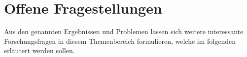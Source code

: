 \section{Offene Fragestellungen}
\label{openChallenges}
Aus den genannten Ergebnissen und Problemen lassen sich weitere interessante Forschungsfragen in diesem Themenbereich formulieren, welche im folgenden erläutert werden sollen.


